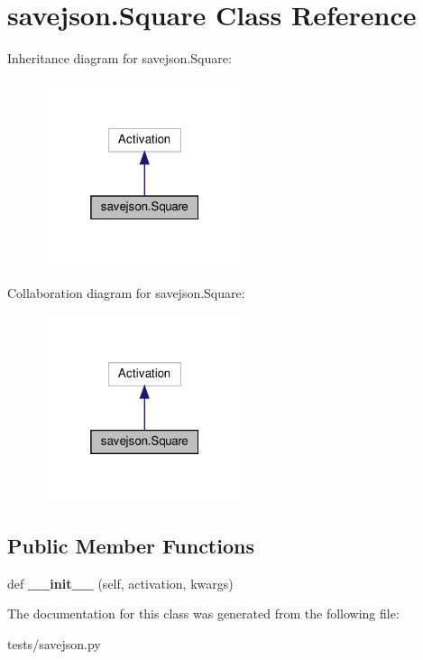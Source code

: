 \hypertarget{classsavejson_1_1Square}{}\section{savejson.\+Square Class Reference}
\label{classsavejson_1_1Square}


Inheritance diagram for savejson.\+Square\+:
\nopagebreak
\begin{figure}[H]
\begin{center}
\leavevmode
\includegraphics[width=169pt]{classsavejson_1_1Square__inherit__graph}
\end{center}
\end{figure}


Collaboration diagram for savejson.\+Square\+:
\nopagebreak
\begin{figure}[H]
\begin{center}
\leavevmode
\includegraphics[width=169pt]{classsavejson_1_1Square__coll__graph}
\end{center}
\end{figure}
\subsection*{Public Member Functions}
\begin{DoxyCompactItemize}
\item 
\mbox{\label{classsavejson_1_1Square_a70c7ba6149619fe509a0758a3ee5cf3f}} 
def {\bfseries \+\_\+\+\_\+init\+\_\+\+\_\+} (self, activation, kwargs)
\end{DoxyCompactItemize}


The documentation for this class was generated from the following file\+:\begin{DoxyCompactItemize}
\item 
tests/savejson.\+py\end{DoxyCompactItemize}

